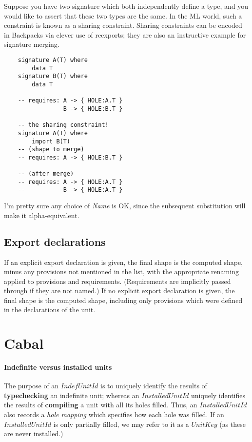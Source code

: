 \documentclass{article}
\newcommand{\I}[1]{\ensuremath{\mathit{#1}}}
\newcommand{\Red}[1]{{\color{red} #1}}
\begin{document}
Suppose you have two signature which both independently define a type,
and you would like to assert that these two types are the same.  In the
ML world, such a constraint is known as a sharing constraint.  Sharing
constraints can be encoded in Backpacks via clever use of reexports;
they are also an instructive example for signature merging.

\begin{verbatim}
    signature A(T) where
        data T
    signature B(T) where
        data T

    -- requires: A -> { HOLE:A.T }
                 B -> { HOLE:B.T }

    -- the sharing constraint!
    signature A(T) where
        import B(T)
    -- (shape to merge)
    -- requires: A -> { HOLE:B.T }

    -- (after merge)
    -- requires: A -> { HOLE:A.T }
    --           B -> { HOLE:A.T }
\end{verbatim}
%
\Red{I'm pretty sure any choice of \textit{Name} is OK, since the
subsequent substitution will make it alpha-equivalent.}

\subsection{Export declarations}

If an explicit export declaration is given, the final shape is the
computed shape, minus any provisions not mentioned in the list, with the
appropriate renaming applied to provisions and requirements.  (Requirements
are implicitly passed through if they are not named.)
If no explicit export declaration is given, the final shape is
the computed shape, including only provisions which were defined
in the declarations of the unit.


\section{Cabal}



\paragraph{Indefinite versus installed units}
The purpose of an \I{IndefUnitId} is to uniquely identify the results of \textbf{typechecking}
an indefinite unit; whereas an \I{InstalledUnitId} uniquely identifies
the results of \textbf{compiling} a unit with all its holes
filled.  Thus, an \I{InstalledUnitId} also records a \emph{hole mapping}
which specifies how each hole was filled.  If an \I{InstalledUnitId}
is only partially filled, we may refer to it as a \I{UnitKey} (as these
are never installed.)
\end{document}
